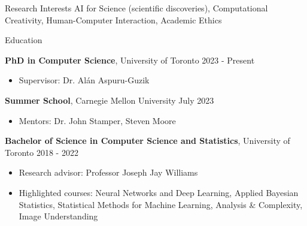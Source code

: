\documentclass{resume} %
\begin{document}
\begin{rSection}{Research Interests}
    AI for Science (scientific discoveries), Computational Creativity, Human-Computer Interaction, Academic Ethics
\end{rSection}
\begin{rSection}{Education}

    \textbf{PhD in Computer Science}, University of Toronto \hfill {2023 - Present}
    \begin{itemize}
        \item Supervisor: Dr. Alán Aspuru-Guzik
    \end{itemize}
    
    \textbf{Summer School}, Carnegie Mellon University \hfill {July 2023}
    \begin{itemize}
        \item Mentors: Dr. John Stamper, Steven Moore
    \end{itemize}
    
    \textbf{Bachelor of Science in Computer Science and Statistics}, University of Toronto \hfill {2018 - 2022}
    \begin{itemize}
        \item Research advisor: Professor Joseph Jay Williams
        \item Highlighted courses: Neural Networks and Deep Learning, Applied Bayesian Statistics, Statistical Methods for Machine Learning, Analysis \& Complexity, Image Understanding
    \end{itemize}

\end{rSection}
\end{document}
